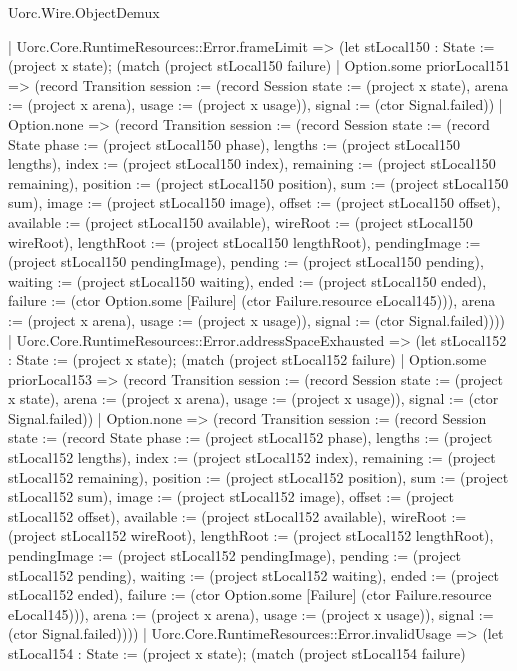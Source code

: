 \begin{lexlean}{Uorc.Wire.ObjectDemux}
\begin{semanticmodule}
{      | Uorc.Core.RuntimeResources::Error.frameLimit => (let stLocal150 : State := (project x state); (match (project stLocal150 failure)
        | Option.some priorLocal151 => (record Transition {session := (record Session {state := (project x state), arena := (project x arena), usage := (project x usage)}), signal := (ctor Signal.failed)})
        | Option.none => (record Transition {session := (record Session {state := (record State {phase := (project stLocal150 phase), lengths := (project stLocal150 lengths), index := (project stLocal150 index), remaining := (project stLocal150 remaining), position := (project stLocal150 position), sum := (project stLocal150 sum), image := (project stLocal150 image), offset := (project stLocal150 offset), available := (project stLocal150 available), wireRoot := (project stLocal150 wireRoot), lengthRoot := (project stLocal150 lengthRoot), pendingImage := (project stLocal150 pendingImage), pending := (project stLocal150 pending), waiting := (project stLocal150 waiting), ended := (project stLocal150 ended), failure := (ctor Option.some [Failure] (ctor Failure.resource eLocal145))}), arena := (project x arena), usage := (project x usage)}), signal := (ctor Signal.failed)})))
      | Uorc.Core.RuntimeResources::Error.addressSpaceExhausted => (let stLocal152 : State := (project x state); (match (project stLocal152 failure)
        | Option.some priorLocal153 => (record Transition {session := (record Session {state := (project x state), arena := (project x arena), usage := (project x usage)}), signal := (ctor Signal.failed)})
        | Option.none => (record Transition {session := (record Session {state := (record State {phase := (project stLocal152 phase), lengths := (project stLocal152 lengths), index := (project stLocal152 index), remaining := (project stLocal152 remaining), position := (project stLocal152 position), sum := (project stLocal152 sum), image := (project stLocal152 image), offset := (project stLocal152 offset), available := (project stLocal152 available), wireRoot := (project stLocal152 wireRoot), lengthRoot := (project stLocal152 lengthRoot), pendingImage := (project stLocal152 pendingImage), pending := (project stLocal152 pending), waiting := (project stLocal152 waiting), ended := (project stLocal152 ended), failure := (ctor Option.some [Failure] (ctor Failure.resource eLocal145))}), arena := (project x arena), usage := (project x usage)}), signal := (ctor Signal.failed)})))
      | Uorc.Core.RuntimeResources::Error.invalidUsage => (let stLocal154 : State := (project x state); (match (project stLocal154 failure)
}
\end{semanticmodule}
\end{lexlean}
